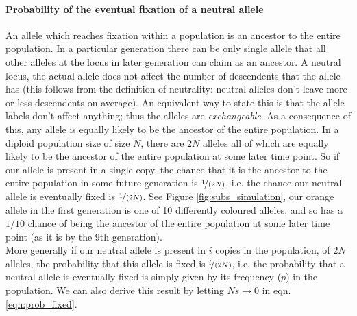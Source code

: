 \paragraph{Probability of the eventual fixation of a neutral allele}
An allele which reaches fixation within a population is an ancestor to the
entire population. In a particular generation there can be only single allele
that all other alleles at the locus in later generation can claim as an
ancestor. A neutral locus, the actual allele does not affect the number of
descendents that the allele has (this follows from the definition of
neutrality: neutral alleles don't leave more or less descendents on average).
An equivalent way to state this is that the allele labels don't affect
anything; thus the alleles are \emph{exchangeable}. As a consequence of this,
any allele is equally likely to be the ancestor of the entire population.  In a
diploid population size of size $N$, there are $2N$ alleles all of which are
equally likely to be the ancestor of the entire population at some later time
point. So if our allele is present in a single copy, the chance that it is the
ancestor to the entire population in some future generation is
$\nicefrac{1}{(2N)}$, i.e. the chance our neutral allele is eventually fixed is
$\nicefrac{1}{(2N)}$.  See Figure \ref{fig:subs_simulation}, our orange allele
in the first generation is one of 10 differently coloured alleles, and so has a
$1/10$ chance of being the ancestor of the entire population at some later time
point (as it is by the 9th generation).\\

More generally if our neutral allele is present in $i$ copies in the
population, of $2N$ alleles, the probability that this allele is fixed is
$\nicefrac{i}{(2N)}$, i.e. the probability that a neutral allele is eventually
fixed is simply given by its frequency ($p$) in the population.  We can also
derive this result by letting $Ns \rightarrow 0$ in eqn.
\eqref{eqn:prob_fixed}.


